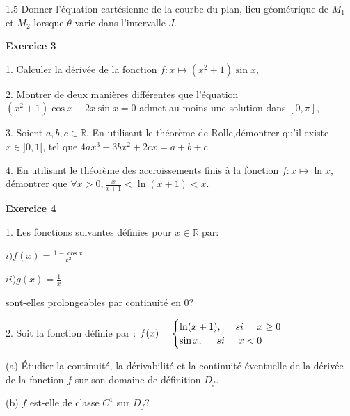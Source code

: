 \documentclass[12pt]{article}
\begin{document}
\begin{spacing}{1.5}
Donner l'équation cartésienne de la courbe du plan, lieu géométrique de $M_1$ et $M_2$ lorsque $\theta$ varie dans l'intervalle $J$.

\medskip\textbf{Exercice 3 }
 
 1. Calculer la dérivée de la fonction $f :x\longmapsto (x^2+1)\sin x$,
 
 2. Montrer de deux manières différentes que l'équation $(x^2+1)\cos x+2x\sin x=0$ admet au moins une solution dans $[0,\pi]$,
 
3. Soient $a,b,c\in \mathbb{R}$. En utilisant le théorème de Rolle,démontrer qu'il existe $x\in ]0,1[$, tel que
 $4ax^3+3bx^2+2cx=a+b+c$
 
4. En utilisant le théorème des accroissements finis à la fonction $f:x\longmapsto \ln x$, démontrer que $\forall {x>0}, \frac{x}{x+1}<\ln(x+1)<x$.

\medskip\textbf{Exercice 4}
 
  1. Les fonctions suivantes définies pour $x\in \mathbb{R}$ par:
 
 $i)f(x)=\frac{1-\cos x}{x^2}$ 
 
 $ii)g(x)= \frac{1}{x}$ 
 
 sont-elles prolongeables par continuité en 0?
 
2. Soit la fonction définie par : $f(x)=\begin{cases}
\ln (x+1), \hspace{0,5 cm} si \hspace{0,5 cm} x\geq 0\\
\sin{x}, \hspace{0,5 cm} si\hspace{0,5 cm} x<0
\end{cases}$

 (a) Étudier la continuité, la dérivabilité et la continuité éventuelle de la dérivée de la fonction $f$ sur son domaine de définition $D_f$.
 
 (b) $f$ est-elle de classe $C^1$ sur $D_f$?
 
 \quad
 

\end{spacing}
\end{document}
